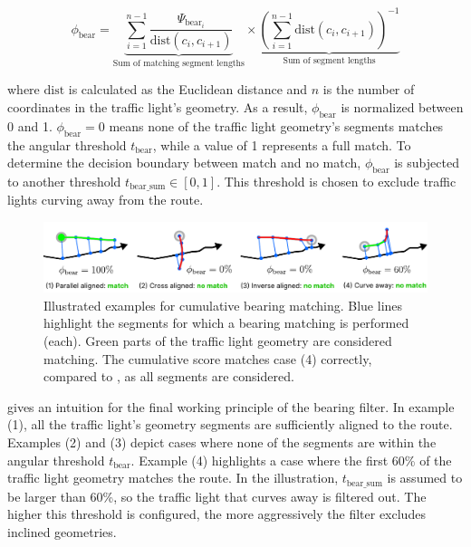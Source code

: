 \begin{equation} 
\phi_{\text{bear}} = 
    \underbrace{\sum_{i=1}^{n-1} 
    \frac{\Psi_{\text{bear}_i}}{\text{dist}(c_i, c_{i+1})}}_{\text{Sum of matching segment lengths}}
    \times
    \underbrace{(\sum_{i=1}^{n-1} \text{dist}(c_i, c_{i+1}))^{-1}}_{\text{Sum of segment lengths}}
\end{equation}

where $\text{dist}$ is calculated as the Euclidean distance and $n$ is the number of coordinates in the traffic light's geometry. As a result, $\phi_{\text{bear}}$ is normalized between 0 and 1. $\phi_{\text{bear}} = 0$ means none of the traffic light geometry's segments matches the angular threshold $t_{\text{bear}}$, while a value of 1 represents a full match. To determine the decision boundary between match and no match, $\phi_{\text{bear}}$ is subjected to another threshold $t_{\text{bear\_sum}} \in [0, 1]$. This threshold is chosen to exclude traffic lights curving away from the route.

\begin{figure}[t]
\centering
\includegraphics[width=\linewidth]{images/sg-selection-bearing-filter-sum.pdf}
\caption{Illustrated examples for cumulative bearing matching. Blue lines highlight the segments for which a bearing matching is performed (each). Green parts of the traffic light geometry are considered matching. The cumulative score matches case (4) correctly, compared to , as all segments are considered.}
\label{fig:sg-selection-bearing-filter-sum}
\end{figure}

 gives an intuition for the final working principle of the bearing filter. In example (1), all the traffic light's geometry segments are sufficiently aligned to the route. Examples (2) and (3) depict cases where none of the segments are within the angular threshold $t_{\text{bear}}$. Example (4) highlights a case where the first 60\% of the traffic light geometry matches the route. In the illustration, $t_{\text{bear\_sum}}$ is assumed to be larger than 60\%, so the traffic light that curves away is filtered out. The higher this threshold is configured, the more aggressively the filter excludes inclined geometries.

